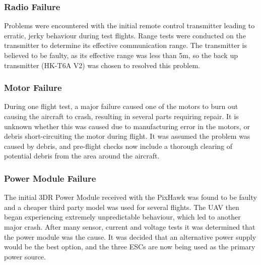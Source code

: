 \subsubsection*{Radio Failure}
Problems were encountered with the initial remote control transmitter leading to erratic, jerky behaviour during test flights. Range tests were conducted on the transmitter to determine its effective communication range. The transmitter is believed to be faulty, as its effective range was less than 5m, so the back up transmitter (HK-T6A V2) was chosen to resolved this problem.

\subsubsection*{Motor Failure}
During one flight test, a major failure caused one of the motors to burn out causing the aircraft to crash, resulting in several parts requiring repair. It is unknown whether this was caused due to manufacturing error in the motors, or debris short-circuiting the motor during flight. It was assumed the problem was caused by debris, and pre-flight checks now include a thorough clearing of potential debris from the area around the aircraft.

\subsubsection*{Power Module Failure}
The initial 3DR Power Module received with the PixHawk was found to be faulty and a cheaper third party model was used for several flights. The UAV then began experiencing extremely unpredictable behaviour, which led to another major crash. After many sensor, current and voltage tests it was determined that the power module was the cause. It was decided that an alternative power supply would be the best option, and the three ESCs are now being used as the primary power source.